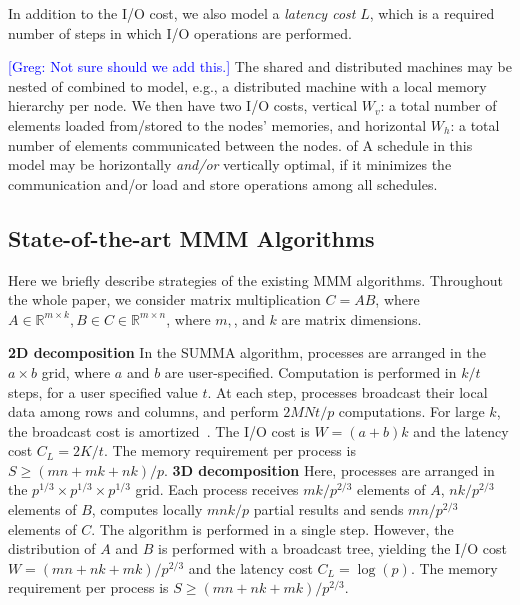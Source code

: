 \documentclass[sigplan,review,anonymous]{acmart}\settopmatter{printfolios=true,printccs=false,printacmref=false}
\newcommand\greg[1]{\textcolor{blue}{[Greg: #1]}}
\newcommand\mac[1]{\textcolor{red}{[Mac: #1]}}
\newcommand{\macb}[1]{\textbf{\textsf{#1}}}
\begin{document}
In addition to the I/O cost, we also model a \emph{latency cost} $L$, which is 
a required number of steps in which I/O operations are performed.

\greg{Not sure should we add this.}
The shared and distributed machines may be nested of combined to model, e.g., a 
distributed machine with a local memory hierarchy per node. We then have two 
I/O costs, vertical $W_v$: a total number of elements loaded from/stored to the 
nodes' memories, and horizontal $W_h$: a total number of elements communicated 
between the nodes. of A schedule in this 
model may be horizontally \emph{and/or} vertically optimal, if it minimizes the 
communication and/or load and store operations among all schedules.


\subsection{State-of-the-art MMM Algorithms}

Here we briefly describe strategies of the existing MMM algorithms.
 Throughout the whole paper, we consider matrix multiplication $C = 
AB$, where $A \in \mathbb{R}^{m \times k}, B \in  C \in \mathbb{R}^{m \times 
	n}$, where $m, $, and $k$ are matrix dimensions.

\macb{2D decomposition}
%
In the SUMMA algorithm, processes are arranged in the  $a \times b$ grid, where 
$a$ and $b$ are user-specified. Computation is performed in $k/t$ steps, for a 
user specified value $t$.  At each step,
processes broadcast their local data among rows and columns, and perform 
$2MNt/p$ computations. For large $k$, the broadcast cost is
amortized~\cite{summa}. The I/O cost is $W = (a+b)k$ and the 
latency cost $C_L = 2K/t$. The
memory requirement per process is $S \ge (mn + mk + nk)/p$. 
%
%
%
%
\macb{3D decomposition}
%
Here, processes are arranged in the $p^{1/3} \times
p^{1/3} \times p^{1/3}$ grid.  Each process receives $mk/p^{2/3}$ elements of 
$A$, $nk/p^{2/3}$ elements of $B$,  computes locally
$mnk/p$ partial results and sends $mn/p^{2/3}$
elements of $C$. The algorithm is performed in a single step.
However, the distribution of $A$ and $B$ is performed with a broadcast tree, 
yielding the I/O cost $W = (mn + nk+mk)/p^{2/3}$ and the latency 
cost
$C_L = \log (p)$.  The memory requirement per process is $S \ge (mn +
nk+mk)/p^{2/3}$. 
\end{document}
